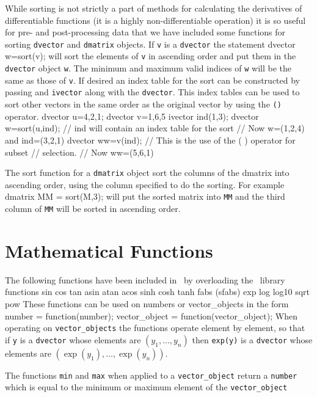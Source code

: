 \documentclass[12pt]{book}
\begin{document}
While sorting is not strictly a part of methods for calculating the
derivatives of differentiable functions (it is a highly non-differentiable
operation) it is so useful for pre- and post-processing data that we
have included some functions for sorting {\tt dvector} and {\tt dmatrix}
objects. If {\tt v} is a {\tt dvector} the statement
\beginexample
dvector w=sort(v);
\endexample
\noindent will sort the elements of {\tt v} in ascending order and 
put them in the {\tt dvector} object {\tt w}. The minimum and
maximum valid indices of {\tt w} will be the same as those of {\tt v}.
If desired an index table for the sort can be constructed by passing
and {\tt ivector} along with the {\tt dvector}. This index tables can be
used to sort other vectors in the same order as the original vector
by using the {\tt ()} operator.
\beginexample
dvector u={4,2,1};
dvector v={1,6,5}
ivector ind(1,3);
dvector w=sort(u,ind); // ind will contain an index table for the sort
// Now w=(1,2,4) and ind=(3,2,1)
dvector ww=v(ind);     // This is the use of the ( ) operator for subset
                       // selection. 
// Now ww=(5,6,1)
\endexample

The sort function for a {\tt dmatrix} object sort the columns of the
dmatrix into ascending order, using the column specified to do the
sorting. For example
\beginexample
dmatrix MM = sort(M,3);
\endexample
\noindent will put the sorted matrix into {\tt MM} and the third column of
{\tt MM} will be sorted in ascending order.

\section{Mathematical Functions}
 The following functions have been included in \AD\ by overloading the 
\cplus\ library functions
\beginexamplea
  sin cos tan asin atan acos sinh cosh tanh fabs (sfabs) exp log log10 sqrt pow 
\endexample
                  
\noindent These functions can be used on numbers or vector\_objects
in the form 
\beginexample
number = function(number);
vector_object = function(vector_object);
\endexample
\noindent When operating on {\tt vector\_objects} the functions operate  
element by element, so that if {\tt y} is a {\tt dvector} whose
elements are $(y_1,\ldots,y_n)$ then {\tt exp(y)} is a 
{\tt dvector} whose elements are $(\exp(y_1),\ldots,\exp(y_n))$.

The functions {\tt min} and {\tt max} when applied to a {\tt vector\_object}
return a {\tt number} which is equal to the minimum or maximum element of the
{\tt vector\_object}
\end{document}

